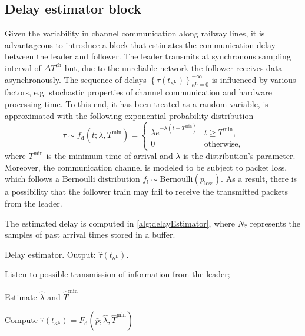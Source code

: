 \documentclass[letterpaper, 10 pt, conference]{ieeeconf}
\theoremstyle{definition}
\theoremstyle{nopoint}
\begin{document}
\subsection{Delay estimator block}
\label{subsec:delayEstimator}  


Given the variability in channel communication along railway lines, it is advantageous to introduce a block that estimates the communication delay between the leader and follower. The leader transmits at synchronous sampling interval of $\Delta T^\mathrm{ch}$ but, due to the unreliable network the follower receives data asynchronously. The sequence of delays $ \left\{ \tau(t_{\kappa^\mathrm{L}})\right\}_{\kappa^\mathrm{L}=0}^{+\infty}$ is influenced by various factors, e.g. stochastic properties of channel communication and hardware processing time. To this end, it has been treated as a random variable,  is  approximated with the following exponential probability distribution 
%
\begin{equation} \label{eq:pdfDelay}
	\tau \sim f_{\mathrm{d}} (t;\lambda, T^\mathrm{min}) = \begin{cases}\lambda e^{-\lambda (t-T^{\min})} & t \geq T^{\min}, \\ 0 & \text{otherwise},\end{cases}
\end{equation}
where $T^\mathrm{min}$ is the minimum time of arrival and $\lambda$ is the distribution's parameter.
Moreover, the communication channel is modeled to be subject to packet loss, which follows a Bernoulli distribution \( f_{\mathrm{l}} \sim \textrm{Bernoulli}(p_\mathrm{loss}) \). As a result, there is a possibility that the follower train may fail to receive the transmitted packets from the leader.


The estimated delay is computed in \ref{alg:delayEstimator}, where $N_{\hat{\tau}}$ represents the samples of past arrival times stored in a buffer.

\begin{algorithm}
	\caption{Delay estimator. Output: $\hat{\tau}(t_{\kappa^\mathrm{L}})$. }\label{alg:delayEstimator}
	\begin{algorithmic}[1]
		\Loop
		
		\State Listen to possible transmission of information from the leader;
		
		
		\State Estimate $\hat{\lambda}$ and $\hat{T}^\mathrm{min}$
		
		\State Compute $\hat{\tau}(t_{\kappa^\mathrm{L}}) = F_{\mathrm{d}} (\bar{p}; \hat{\lambda}, \hat{T}^\mathrm{min})$
		
		\EndIf
		
		
		
		\EndLoop
		
	\end{algorithmic}
\end{algorithm}
\end{document}
